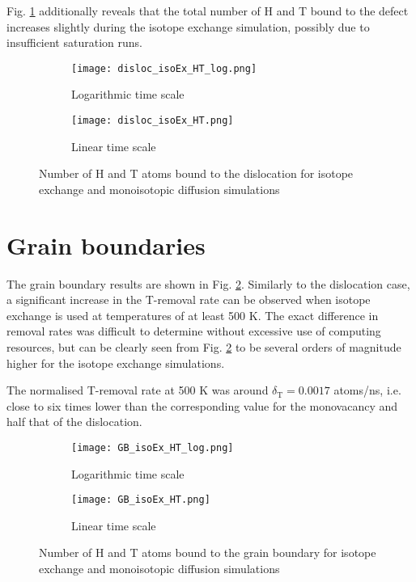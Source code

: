 Fig. \ref{Fig:disloc_results} additionally reveals that the total number of H and T bound to the defect increases slightly during the isotope exchange simulation, possibly due to insufficient saturation runs. 

\vspace{15mm} 

\begin{figure}[!ht]
\begin{subfigure}{.5\textwidth}
  \centering
 \texttt{[image: disloc\_isoEx\_HT\_log.png]}  
  \caption{Logarithmic time scale}
\end{subfigure}
\begin{subfigure}{.5\textwidth}
  \centering
  \texttt{[image: disloc\_isoEx\_HT.png]}  
  \caption{Linear time scale}
\end{subfigure}
   \caption{Number of H and T atoms bound to the dislocation for isotope exchange and monoisotopic diffusion simulations}
   \label{Fig:disloc_results} 
\end{figure}

\pagebreak

\section{Grain boundaries}
The grain boundary results are shown in Fig. \ref{Fig:GB_results}. 
Similarly to the dislocation case, a significant increase in the T-removal rate can be observed when isotope exchange is used at temperatures of at least 500 K.
The exact difference in removal rates was difficult to determine without excessive use of computing resources, but can be clearly seen from Fig. \ref{Fig:GB_results} to be several orders of magnitude higher for the isotope exchange simulations.

The normalised T-removal rate at 500 K was around $\delta_{\text{T}} = 0.0017$ atoms/ns, i.e. close to six times lower than the corresponding value for the monovacancy and half that of the dislocation.

\begin{figure}[!ht]
\begin{subfigure}{.5\textwidth}
  \centering
 \texttt{[image: GB\_isoEx\_HT\_log.png]}  
  \caption{Logarithmic time scale}
\end{subfigure}
\begin{subfigure}{.5\textwidth}
  \centering
  \texttt{[image: GB\_isoEx\_HT.png]}  
  \caption{Linear time scale}
\end{subfigure}
   \caption{Number of H and T atoms bound to the grain boundary for isotope exchange and monoisotopic diffusion simulations}
   \label{Fig:GB_results} 
\end{figure}

